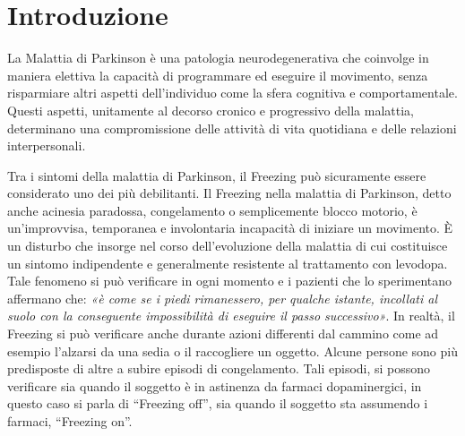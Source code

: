 


\chapter{Introduzione}\label{cap1:Introduzione}

La Malattia di Parkinson è una patologia neurodegenerativa che coinvolge in maniera elettiva la capacità di programmare ed eseguire il movimento, senza risparmiare altri aspetti dell’individuo come la sfera cognitiva e comportamentale. Questi aspetti, unitamente al decorso cronico e progressivo della malattia, determinano una compromissione delle attività di vita quotidiana e delle relazioni interpersonali.

Tra i sintomi della malattia di Parkinson, il Freezing può sicuramente essere considerato uno dei più debilitanti. Il Freezing nella malattia di Parkinson, detto anche acinesia paradossa, congelamento o semplicemente blocco motorio, è un’improvvisa, temporanea e involontaria incapacità di iniziare un movimento. È un disturbo che insorge nel corso dell’evoluzione della malattia di cui costituisce un sintomo indipendente e generalmente resistente al trattamento con levodopa. Tale fenomeno si può verificare in ogni momento e i pazienti che lo sperimentano affermano che: \textit{«è come se i piedi rimanessero, per qualche istante, incollati al suolo con la conseguente impossibilità di eseguire il passo successivo»}. In realtà, il Freezing si può verificare anche durante azioni differenti dal cammino come ad esempio l’alzarsi da una sedia o il raccogliere un oggetto. Alcune persone sono più predisposte di altre a subire episodi di congelamento. Tali episodi, si possono verificare sia quando il soggetto è in astinenza da farmaci dopaminergici, in questo caso si parla di “Freezing off”, sia quando il soggetto sta assumendo i farmaci, “Freezing on”. \\

